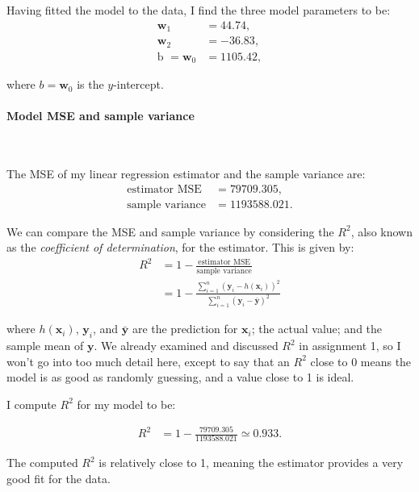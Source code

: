 Having fitted the model to the data, I find the three model parameters to be:
\begin{align*}
  \mathbf{w}_1 &= 44.74,\\
  \mathbf{w}_2 &= -36.83,\\
  \text{b } = \mathbf{w}_0 &= 1105.42,
\end{align*}

where $b = \mathbf{w}_0$ is the $y$-intercept.

\paragraph{Model MSE and sample variance}~

The MSE of my linear regression estimator and the sample variance are:
\begin{align*}
  \text{estimator MSE}   &= 79709.305,\\
  \text{sample variance} &= 1193588.021.
\end{align*}

We can compare the MSE and sample variance by considering the $R^2$, also known
as the \textit{coefficient of determination}, for the estimator. This is given by:
\begin{align*}
  R^2 &= 1 - \frac{\text{estimator MSE}}{\text{sample variance}}\\[8pt]
      &= 1 - \frac{\sum_{i = 1}^n (\mathbf{y}_i - h(\mathbf{x}_i))^2}{\sum_{i = 1}^n (\mathbf{y}_i - \bar{\mathbf{y}})^2}
\end{align*}

where $h(\mathbf{x}_i)$, $\mathbf{y}_i$, and $\bar{\mathbf{y}}$ are the
prediction for $\mathbf{x}_i$; the actual value; and the sample mean of
$\mathbf{y}$. We already examined and discussed $R^2$ in assignment 1, so I
won't go into too much detail here, except to say that an $R^2$ close to 0 means
the model is as good as randomly guessing, and a value close to 1 is ideal.

I compute $R^2$ for my model to be:

\begin{align*}
  R^2 &= 1 - \frac{79709.305}{1193588.021}
  \simeq 0.933.
\end{align*}

The computed $R^2$ is relatively close to 1, meaning the estimator provides a
very good fit for the data.

\sectend
